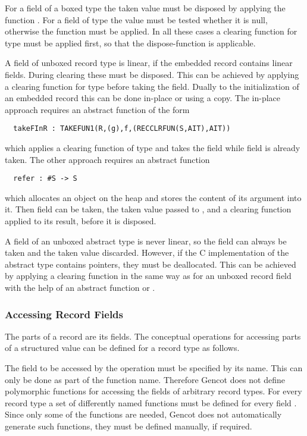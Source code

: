 For a field of a boxed type  the taken value must be disposed by applying the function .
For a field of type
 the value must be tested whether it is null, otherwise the function  must be applied. In
all these cases a clearing function for type  must be applied first, so that the dispose-function is applicable.

A field of unboxed record type  is linear, if the embedded record contains linear fields. During clearing these must be
disposed. This can be achieved by applying a clearing function for type  before taking the field. Dually to the 
initialization of an embedded record this can be done in-place or using a copy. The in-place approach requires an abstract
function of the form
\begin{verbatim}
  takeFInR : TAKEFUN1(R,(g),f,(RECCLRFUN(S,AIT),AIT))
\end{verbatim}
which applies a clearing function of type  and takes the field  while field  is already taken.
The other approach requires an abstract function 
\begin{verbatim}
  refer : #S -> S
\end{verbatim}
which allocates an object on the heap and stores the content of its argument into it. Then field  can be taken, the taken
value passed to , and a clearing function applied to its result, before it is disposed.

A field of an unboxed abstract type is never linear, so the field can always be taken and the taken value discarded.
However, if the C implementation of the abstract type contains pointers, they must be deallocated. This can be achieved by
applying a clearing function in the same way as for an unboxed record field with the help of an abstract function
 or .

\subsubsection{Accessing Record Fields}

The parts of a record are its fields. The conceptual operations for accessing parts of a structured value can be defined for a record type 
 as follows.

The field to be accessed by the operation must be specified by its name. This can only be done as part of the function name.
Therefore Gencot does not define polymorphic functions for accessing the fields of arbitrary record types. For every record type
 a set of differently named functions must be defined for every field . Since only some of the functions are needed, Gencot
does not automatically generate such functions, they must be defined manually, if required.

